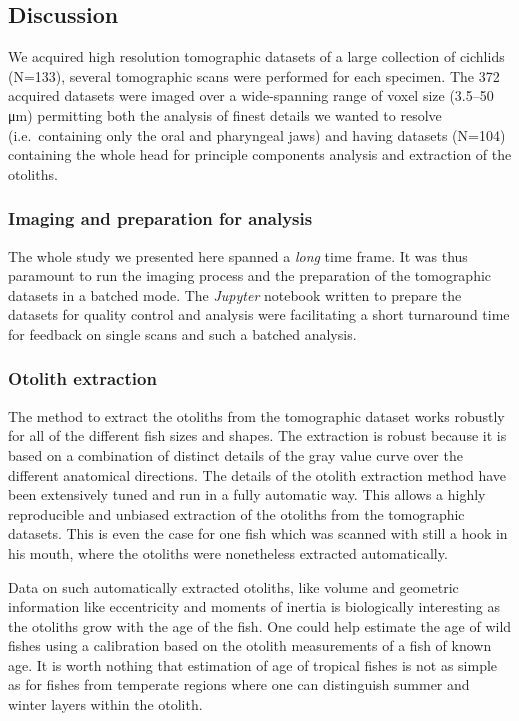 \hypertarget{discussion}{%
\subsection{Discussion}\label{discussion}}

We acquired high resolution tomographic datasets of a large collection of cichlids (N=133), several tomographic scans were performed for each specimen.
The 372 acquired datasets were imaged over a wide-spanning range of voxel size (3.5--50 μm) permitting both the analysis of finest details we wanted to resolve (i.e.~containing only the oral and pharyngeal jaws) and having datasets (N=104) containing the whole head for principle components analysis and extraction of the otoliths.

\hypertarget{imaging-and-preparation-for-analysis}{%
\subsubsection{Imaging and preparation for analysis}\label{imaging-and-preparation-for-analysis}}

The whole study we presented here spanned a \emph{long} time frame.
It was thus paramount to run the imaging process and the preparation of the tomographic datasets in a batched mode.
The \emph{Jupyter} notebook written to prepare the datasets for quality control and analysis were facilitating a short turnaround time for feedback on single scans and such a batched analysis.

\hypertarget{otolith-extraction}{%
\subsubsection{Otolith extraction}\label{otolith-extraction}}

The method to extract the otoliths from the tomographic dataset works robustly for all of the different fish sizes and shapes.
The extraction is robust because it is based on a combination of distinct details of the gray value curve over the different anatomical directions.
The details of the otolith extraction method have been extensively tuned and run in a fully automatic way.
This allows a highly reproducible and unbiased extraction of the otoliths from the tomographic datasets.
This is even the case for one fish which was scanned with still a hook in his mouth, where the otoliths were nonetheless extracted automatically.

Data on such automatically extracted otoliths, like volume and geometric information like eccentricity and moments of inertia is biologically interesting as the otoliths grow with the age of the fish.
One could help estimate the age of wild fishes using a calibration based on the otolith measurements of a fish of known age.
It is worth nothing that estimation of age of tropical fishes is not as simple as for fishes from temperate regions where one can distinguish summer and winter layers within the otolith.

